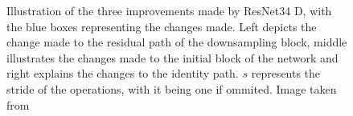 \begin{figure}[htbp]
    \caption{Illustration of the three improvements made by ResNet34 D, with the blue boxes representing the changes made. Left depicts the change made to the residual path of the downsampling block, middle illustrates the changes made to the initial block of the network and right explains the changes to the identity path. $s$ represents the stride of the operations, with it being one if ommited. Image taken from \cite{heBagTricksImage2018}}
    \label{fig:resnet34d}
\end{figure}


